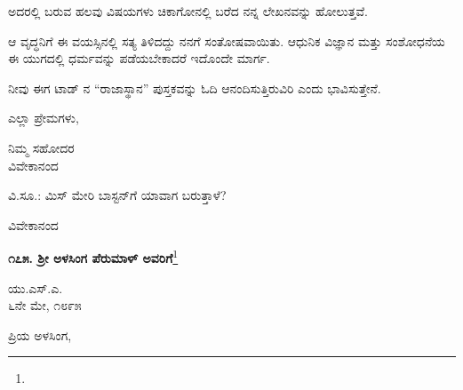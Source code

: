 ಅದರಲ್ಲಿ ಬರುವ ಹಲವು ವಿಷಯಗಳು ಚಿಕಾಗೋನಲ್ಲಿ ಬರೆದ ನನ್ನ ಲೇಖನವನ್ನು ಹೋಲುತ್ತವೆ.

ಆ ವೃದ್ಧನಿಗೆ ಈ ವಯಸ್ಸಿನಲ್ಲಿ ಸತ್ಯ ತಿಳಿದದ್ದು ನನಗೆ ಸಂತೋಷವಾಯಿತು. ಆಧುನಿಕ ವಿಜ್ಞಾನ ಮತ್ತು ಸಂಶೋಧನೆಯ ಈ ಯುಗದಲ್ಲಿ ಧರ್ಮವನ್ನು ಪಡೆಯಬೇಕಾದರೆ ಇದೊಂದೇ ಮಾರ್ಗ.

ನೀವು ಈಗ ಟಾಡ್ ನ “ರಾಜಾಸ್ಥಾನ” ಪುಸ್ತಕವನ್ನು ಓದಿ ಆನಂದಿಸುತ್ತಿರುವಿರಿ ಎಂದು ಭಾವಿಸುತ್ತೇನೆ.

ಎಲ್ಲಾ ಪ್ರೇಮಗಳು,

\vspace{-0.5cm}

\begin{flushright}
ನಿಮ್ಮ ಸಹೋದರ\\ವಿವೇಕಾನಂದ
\end{flushright}

\vspace{-0.5cm}

ವಿ.ಸೂ.: ಮಿಸ್‌ ಮೇರಿ ಬಾಸ್ಟನ್‌ಗೆ ಯಾವಾಗ ಬರುತ್ತಾಳೆ?

\vspace{-0.5cm}

{\flushright
ವಿವೇಕಾನಂದ\par}

\begin{center}
\textbf{೧೭೫. ಶ‍್ರೀ ಅಳಸಿಂಗ ಪೆರುಮಾಳ್ ಅವರಿಗೆ}\footnote{}
\end{center}

\vspace{-0.5cm}

\begin{flushright}
ಯು.ಎಸ್.ಎ.\\೬ನೇ ಮೇ, ೧೮೯೫
\end{flushright}

\vspace{-0.5cm}

\noindent
ಪ್ರಿಯ ಅಳಸಿಂಗ,

